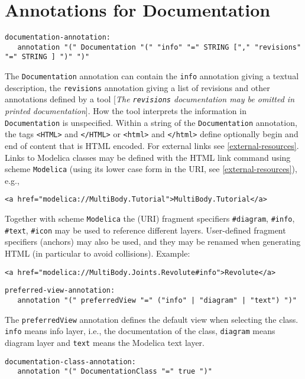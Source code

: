 \section{Annotations for Documentation}

\begin{lstlisting}[language=grammar]
documentation-annotation:
   annotation "(" Documentation "(" "info" "=" STRING ["," "revisions" "=" STRING ] ")" ")"
\end{lstlisting}
The \lstinline!Documentation! annotation can contain the \lstinline!info! annotation
giving a textual description, the \lstinline!revisions! annotation giving a list
of revisions and other annotations defined by a tool {[}\emph{The
\lstinline!revisions! documentation may be omitted in printed documentation}{]}.
How the tool interprets the information in \lstinline!Documentation! is
unspecified. Within a string of the \lstinline!Documentation! annotation, the
tags \lstinline!<HTML>! and \lstinline!</HTML>! or
\lstinline!<html>! and \lstinline!</html>! define
optionally begin and end of content that is HTML encoded. For external
links see \autoref{external-resources}. Links to Modelica classes may be defined with
the HTML link command using scheme \lstinline!Modelica!
(using its lower case form in the URI, see \autoref{external-resources}), e.g.,
\begin{lstlisting}[language=modelica]
<a href="modelica://MultiBody.Tutorial">MultiBody.Tutorial</a>
\end{lstlisting}

Together with scheme \lstinline!Modelica! the (URI) fragment specifiers
\lstinline!#diagram!, \lstinline!#info!, \lstinline!#text!, \lstinline!#icon! may be used to reference different
layers. User-defined fragment specifiers (anchors) may also be used, and they may be renamed
when generating HTML (in particular to avoid collisions).
Example:
\begin{lstlisting}[language=modelica]
<a href="modelica://MultiBody.Joints.Revolute#info">Revolute</a>
\end{lstlisting}
\begin{lstlisting}[language=grammar]
preferred-view-annotation:
   annotation "(" preferredView "=" ("info" | "diagram" | "text") ")"
\end{lstlisting}

The \lstinline!preferredView! annotation defines the default view when selecting the
class. \lstinline!info! means info layer, i.e., the documentation of the class,
\lstinline!diagram! means diagram layer and \lstinline!text! means the Modelica text layer.
\begin{lstlisting}[language=grammar]
documentation-class-annotation:
   annotation "(" DocumentationClass "=" true ")"
\end{lstlisting}

